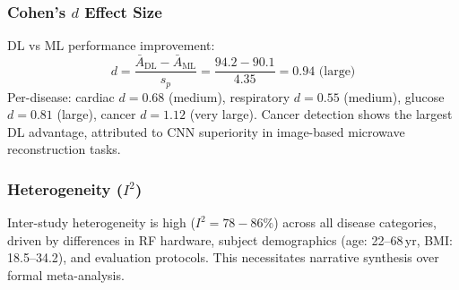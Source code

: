 \documentclass[journal,twoside]{IEEEtran}
\begin{document}
\subsubsection{Cohen's $d$ Effect Size}
DL vs ML performance improvement:
\begin{equation}
d = \frac{\bar{A}_{\text{DL}} - \bar{A}_{\text{ML}}}{s_p} = \frac{94.2 - 90.1}{4.35} = 0.94 \text{ (large)}
\end{equation}
Per-disease: cardiac $d = 0.68$ (medium), respiratory $d = 0.55$ (medium), glucose $d = 0.81$ (large), cancer $d = 1.12$ (very large). Cancer detection shows the largest DL advantage, attributed to CNN superiority in image-based microwave reconstruction tasks.

\subsubsection{Heterogeneity ($I^2$)}
Inter-study heterogeneity is high ($I^2 = 78{-}86\%$) across all disease categories, driven by differences in RF hardware, subject demographics (age: 22--68\,yr, BMI: 18.5--34.2), and evaluation protocols. This necessitates narrative synthesis over formal meta-analysis.
\end{document}
